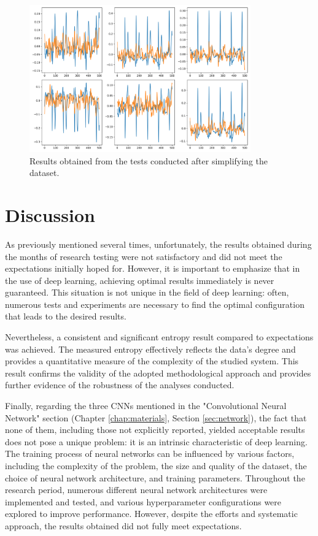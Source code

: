\documentclass[12pt,italian]{report}
\begin{document}
\begin{figure}[H]
    \centering
    \includegraphics[width=0.85\textwidth]{images/second_cnn_result_second_plot_1.png}
    \captionsetup{justification=centering}
    \caption{Results obtained from the tests conducted after simplifying the dataset.}
    \label{fig:second_cnn_result_second_plot_1}
\end{figure}

\section{Discussion}
\label{sec:discussione}

As previously mentioned several times, unfortunately, the results obtained during the months of research testing were not satisfactory and did not meet the expectations initially hoped for. However, it is important to emphasize that in the use of deep learning, achieving optimal results immediately is never guaranteed. This situation is not unique in the field of deep learning: often, numerous tests and experiments are necessary to find the optimal configuration that leads to the desired results.

Nevertheless, a consistent and significant entropy result compared to expectations was achieved. The measured entropy effectively reflects the data's degree and provides a quantitative measure of the complexity of the studied system. This result confirms the validity of the adopted methodological approach and provides further evidence of the robustness of the analyses conducted.

Finally, regarding the three CNNs mentioned in the "Convolutional Neural Network" section (Chapter \ref{chap:materials}, Section \ref{sec:network}), the fact that none of them, including those not explicitly reported, yielded acceptable results does not pose a unique problem: it is an intrinsic characteristic of deep learning. The training process of neural networks can be influenced by various factors, including the complexity of the problem, the size and quality of the dataset, the choice of neural network architecture, and training parameters. Throughout the research period, numerous different neural network architectures were implemented and tested, and various hyperparameter configurations were explored to improve performance. However, despite the efforts and systematic approach, the results obtained did not fully meet expectations.
\end{document}
